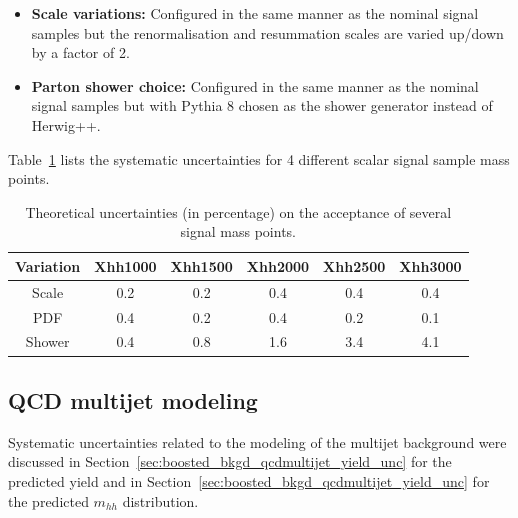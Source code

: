 \begin{itemize}
\item \textbf{Scale variations:} Configured in the same manner as the nominal signal samples but
the renormalisation and resummation scales are varied up/down by a factor of 2.
 
 
\item \textbf{Parton shower choice:} Configured in the same manner as the nominal signal samples but
with Pythia 8 chosen as the shower generator instead of Herwig++.
\end{itemize}
 
Table~\ref{tab:boosted_unc_signal} lists the systematic uncertainties for 4 different scalar signal sample
mass points.
 
\begin{table}[htbp!]
\begin{center}
\begin{tabular}{c|c|c|c|c|c}
Variation    &  Xhh1000  &  Xhh1500 & Xhh2000 & Xhh2500 & Xhh3000   \\
\hline
Scale        &    0.2    &    0.2   &  0.4    &  0.4   &  0.4  \\
PDF          &    0.4    &    0.2   &  0.4    &  0.2   &  0.1  \\
Shower       &    0.4    &    0.8   &  1.6    &  3.4   &  4.1  \\
\end{tabular}
\end{center}
\caption{Theoretical uncertainties (in percentage) on the acceptance of several signal mass points.}
\label{tab:boosted_unc_signal}
 
 
\end{table}
\subsection{QCD multijet modeling}
\label{sec:boosted_syst_modeling_multijet}
 
Systematic uncertainties related to the modeling of the multijet background were discussed in Section~\ref{sec:boosted_bkgd_qcdmultijet_yield_unc}
for the predicted yield and in Section~\ref{sec:boosted_bkgd_qcdmultijet_yield_unc} for the predicted $m_{hh}$ distribution.
